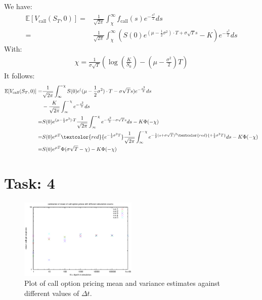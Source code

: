 \documentclass{article}
\begin{document}
\noindent We have:
\begin{align*}
 \mathbb{E}[V_{\text{call}}(S_T,0)] =& \frac{1}{\sqrt{2 \pi}} \int_{\chi}^\infty f_{\text{call}}(s)e^{-\frac{s^2}{2}}ds\\
  =&\frac{1}{\sqrt{2 \pi}} \int_{\chi}^\infty \left( S(0)e^{(\mu-\frac{1}{2}\sigma^2)\cdot T+\sigma\sqrt{T}s}-K\right)e^{-\frac{s^2}{2}}ds
\end{align*}
With:
\begin{align*}
 \chi = \frac{1}{\sigma \sqrt{T}}\left(\log\left(\frac{K}{S_0}\right)-\left(\mu-\frac{\sigma^2}{2}\right)T\right)
\end{align*}
It follows:
\begin{align*}
 \mathbb{E}[V_{\text{call}}(S_T,0)] =&\frac{1}{\sqrt{2 \pi}} \int_{\infty}^{-\chi} S(0)e^((\mu-\frac{1}{2}\sigma^2)\cdot T-\sigma\sqrt{T}s)e^{-\frac{s^2}{2}}ds\\
      & - \frac{K}{\sqrt{2 \pi}} \int_{\infty}^{-\chi} e^{-\frac{s^2}{2}}ds\\
      =&S(0) e^{(\mu-\frac{1}{2}\sigma^2)\cdot T}\frac{1}{\sqrt{2 \pi}} \int_{\infty}^{-\chi} e^{-\frac{s^2}{2}-\sigma\sqrt{T}s}ds - K \Phi(-\chi)\\
      =&S(0) e^{\mu T}\textcolor{red}{e^{-\frac{1}{2}\sigma^2 T}}\frac{1}{\sqrt{2 \pi}} \int_{\infty}^{-\chi} e^{-\frac{1}{2}(s+\sigma\sqrt{T})^2\textcolor{red}{+\frac{1}{2}\sigma^2 T}}ds - K \Phi(-\chi)\\
      =&S(0) e^{\mu T} \Phi(\sigma \sqrt{T} - \chi) - K \Phi(-\chi)
\end{align*}
\flushright{$\qed$}

\section*{Task: 4}  %
\begin{figure}[htbp]
  \centering
    \includegraphics[width=0.50\textwidth]{../Task04/sh2_task4_plot.eps}
  \caption{Plot of call option pricing mean and variance estimates against different values of $\Delta t$.}
\end{figure}
\end{document}
